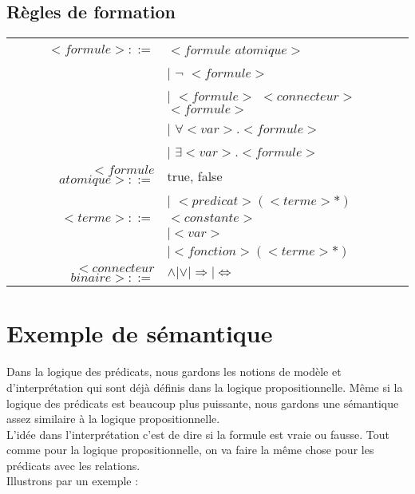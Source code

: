 \subsection{Règles de formation}
\begin{tabular}{rl}
$<formule>::=$ 	  &	$<formule$ $atomique>$ \\
				  & $\vert$ $\neg$ $<formule>$ \\
				  & $\vert$ $<formule>$ $<connecteur>$ $<formule>$ \\
				  & $\vert$ $\forall <var>.<formule>$ \\
				  & $\vert$ $\exists <var>.<formule>$ \\
$<formule$ $atomique>::=$ 
				  & true, false \\
				  & $\vert$ $<predicat>(<terme>*)$ \\
$<terme>::=$	  & $<constante>$ \\
				  & $\vert <var>$ \\
				  & $\vert <fonction>(<terme>*)$ \\
$<connecteur$ $binaire>::=$ 
				  & $\wedge \vert \vee \vert \Rightarrow \vert \Leftrightarrow$ \\

\end{tabular}

\section{Exemple de sémantique}
Dans la logique des prédicats, nous gardons les notions de modèle et d'interprétation qui sont déjà définis dans la logique propositionnelle. Même si la logique des prédicats est beaucoup plus puissante, nous gardons une sémantique assez similaire à la logique propositionnelle. \\
L'idée dans l'interprétation c'est de dire si la formule est vraie ou fausse. Tout comme pour la logique propositionnelle, on va faire la même chose pour les prédicats avec les relations.\\

Illustrons par un exemple : 

